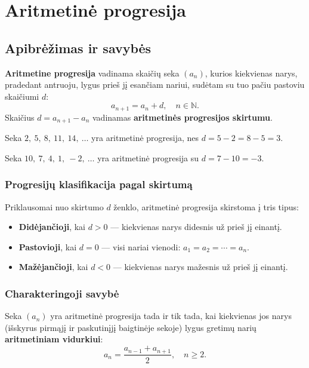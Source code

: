 \section{Aritmetinė progresija}

\subsection{Apibrėžimas ir savybės}

\begin{definition}
\textbf{Aritmetine progresija} vadinama skaičių seka $(a_n)$, kurios kiekvienas narys, pradedant antruoju, lygus prieš jį esančiam nariui, sudėtam su tuo pačiu pastoviu skaičiumi $d$:
\[
a_{n+1} = a_n + d, \quad n \in \mathbb{N}.
\]
Skaičius $d = a_{n+1} - a_n$ vadinamas \textbf{aritmetinės progresijos skirtumu}.
\end{definition}

\begin{example}
Seka $2,\ 5,\ 8,\ 11,\ 14,\ \ldots$ yra aritmetinė progresija, nes $d = 5 - 2 = 8 - 5 = 3$.
\end{example}

\begin{example}
Seka $10,\ 7,\ 4,\ 1,\ -2,\ \ldots$ yra aritmetinė progresija su $d = 7 - 10 = -3$.
\end{example}

\subsubsection*{Progresijų klasifikacija pagal skirtumą}

Priklausomai nuo skirtumo $d$ ženklo, aritmetinė progresija skirstoma į tris tipus:

\begin{itemize}
    \item \textbf{Didėjančioji}, kai $d > 0$ — kiekvienas narys didesnis už prieš jį einantį.
    \item \textbf{Pastovioji}, kai $d = 0$ — visi nariai vienodi: $a_1 = a_2 = \cdots = a_n$.
    \item \textbf{Mažėjančioji}, kai $d < 0$ — kiekvienas narys mažesnis už prieš jį einantį.
\end{itemize}

\subsubsection*{Charakteringoji savybė}

\begin{theorem}
Seka $(a_n)$ yra aritmetinė progresija tada ir tik tada, kai kiekvienas jos narys (išskyrus pirmąjį ir paskutinįjį baigtinėje sekoje) lygus gretimų narių \textbf{aritmetiniam vidurkiui}:
\[
a_n = \frac{a_{n-1} + a_{n+1}}{2}, \quad n \geq 2.
\]
\end{theorem}

